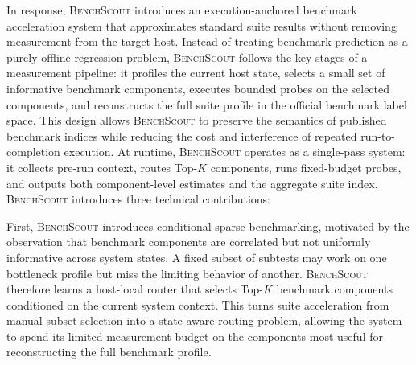 \documentclass[sigplan,10pt]{acmart}
\newcommand{\ourmethod}{\textsc{BenchScout}\xspace}
\begin{document}

In response, \ourmethod{} introduces an execution-anchored benchmark acceleration system that approximates standard suite results without removing measurement from the target host.
Instead of treating benchmark prediction as a purely offline regression problem, \ourmethod{} follows the key stages of a measurement pipeline: it profiles the current host state, selects a small set of informative benchmark components, executes bounded probes on the selected components, and reconstructs the full suite profile in the official benchmark label space.
This design allows \ourmethod{} to preserve the semantics of published benchmark indices while reducing the cost and interference of repeated run-to-completion execution.
At runtime, \ourmethod{} operates as a single-pass system: it collects pre-run context, routes Top-\(K\) components, runs fixed-budget probes, and outputs both component-level estimates and the aggregate suite index. \ourmethod{} introduces three technical contributions:

First, \ourmethod{} introduces conditional sparse benchmarking, motivated by the observation that benchmark components are correlated but not uniformly informative across system states.
A fixed subset of subtests may work on one bottleneck profile but miss the limiting behavior of another.
\ourmethod{} therefore learns a host-local router that selects Top-\(K\) benchmark components conditioned on the current system context.
This turns suite acceleration from manual subset selection into a state-aware routing problem, allowing the system to spend its limited measurement budget on the components most useful for reconstructing the full benchmark profile.
\end{document}
